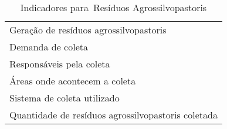 \begin{table}[h!]
  \centering
  \caption{Indicadores para Resíduos Agrossilvopastoris}
    \begin{tabular}{|p{25em}|}
    \rowcolor[rgb]{ .984,  .831,  .706} \multicolumn{1}{P{25em}}{RESÍDUOS AGROSSILVOPASTORIS} \\
    \midrule
    Geração de resíduos agrossilvopastoris  \\
    \midrule
    Demanda de coleta  \\
    \midrule
    Responsáveis pela coleta \\
    \midrule
    Áreas onde acontecem a coleta \\
    \midrule
    Sistema de coleta utilizado \\
    \midrule
    Quantidade de resíduos agrossilvopastoris coletada \\
    \bottomrule
    \end{tabular}%
  \label{tab:ind_agrossilvo}%
\end{table}%
